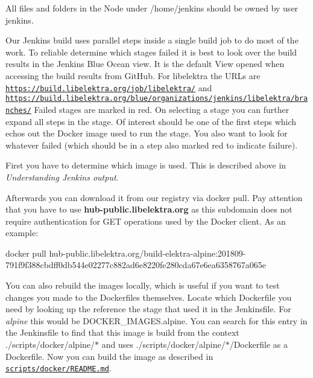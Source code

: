 All files and folders in the Node under {\ttfamily /home/jenkins} should be owned by user {\ttfamily jenkins}.

Our Jenkins build uses parallel steps inside a single build job to do most of the work. To reliable determine which stages failed it is best to look over the build results in the Jenkins Blue Ocean view. It is the default View opened when accessing the build results from Git\+Hub. For libelektra the U\+R\+Ls are \href{https://build.libelektra.org/job/libelektra/}{\tt https\+://build.\+libelektra.\+org/job/libelektra/} and \href{https://build.libelektra.org/blue/organizations/jenkins/libelektra/branches/}{\tt https\+://build.\+libelektra.\+org/blue/organizations/jenkins/libelektra/branches/} Failed stages are marked in red. On selecting a stage you can further expand all steps in the stage. Of interest should be one of the first steps which echos out the Docker image used to run the stage. You also want to look for whatever failed (which should be in a step also marked red to indicate failure).

First you have to determine which image is used. This is described above in {\itshape Understanding Jenkins output}.

Afterwards you can download it from our registry via {\ttfamily docker pull}. Pay attention that you have to use {\bfseries hub-\/public.\+libelektra.\+org} as this subdomain does not require authentication for G\+ET operations used by the Docker client. As an example\+:


\begin{DoxyCode}
docker pull
       hub-public.libelektra.org/build-elektra-alpine:201809-791f9f388cbdff0db544e02277c882ad6e8220fe280cda67e6ea6358767a065e
\end{DoxyCode}


You can also rebuild the images locally, which is useful if you want to test changes you made to the Dockerfiles themselves. Locate which Dockerfile you need by looking up the reference the stage that used it in the Jenkinsfile. For {\itshape alpine} this would be {\ttfamily D\+O\+C\+K\+E\+R\+\_\+\+I\+M\+A\+G\+E\+S.\+alpine}. You can search for this entry in the Jenkinsfile to find that this image is build from the context {\ttfamily ./scripts/docker/alpine/$\ast$} and uses {\ttfamily ./scripts/docker/alpine/$\ast$/\+Dockerfile} as a Dockerfile. Now you can build the image as described in \href{https://master.libelektra.org/scripts/docker/README.md#building-images-locally}{\tt scripts/docker/\+R\+E\+A\+D\+M\+E.\+md}.

